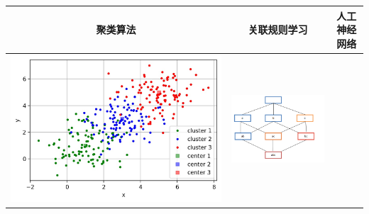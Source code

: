 \begin{longtable}[]{ccc}
    \label{fig:2.5.4}
\toprule
聚类算法 & 关联规则学习 & 人工神经网络
\tabularnewline
\midrule
\endhead
\begin{minipage}{1.0\linewidth}
\includegraphics[width=1.0\linewidth]{./img/ch2/sec1/7.jpg}  
\end{minipage}
 &
\begin{minipage}{1.0\linewidth}
\includegraphics[width=1.0\linewidth]{./img/ch2/guan.png}   
\end{minipage}
&
\begin{minipage}{1.0\linewidth}

\end{minipage}
\end{longtable}

